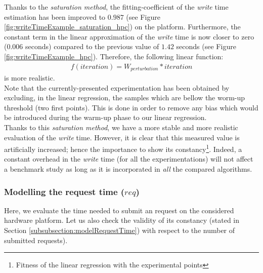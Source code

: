 			Thanks to the \emph{saturation method}, the fitting-coefficient of the \emph{write} time estimation has been improved to $0.987$ (see Figure \ref{fig:writeTimeExample_saturation_hpc}) on the \targetPlatformHpc\space platform.   Furthermore, the constant term in the linear approximation of the \emph{write} time is now closer to zero ($0.006$ seconds) compared to the previous value of $1.42$ seconds (see Figure \ref{fig:writeTimeExample_hpc}).   Therefore, the following linear function:
				\begin{equation*}
				\begin{aligned}
					f(iteration) = W_{perturbation} * iteration
				\end{aligned}
				\end{equation*}
			is more realistic.\\
			Note that the currently-presented experimentation has been obtained by excluding, in the linear regression, the samples which are bellow the worm-up threshold (two first points).   This is done in order to remove any bias which would be introduced during the warm-up phase to our linear regression.\\

			Thanks to this \emph{saturation method}, we have a more stable and more realistic evaluation of the \emph{write} time.   However, it is clear that this measured value is artificially increased; hence the importance to show its constancy\footnote{Fitness of the linear regression with the experimental points}.   Indeed, a constant overhead in the \emph{write} time (for all the experimentations) will not affect a benchmark study as long as it is incorporated in \emph{all} the compared algorithms.


		\subsubsection{Modelling the \notationaio\space request time ($req$)}
			Here, we evaluate the time needed to submit an \notationaio\space request on the considered hardware platform.   Let us also check the validity of its constancy (stated in Section \ref{subsubsection:modelRequestTime}) with respect to the number of submitted requests).\\

